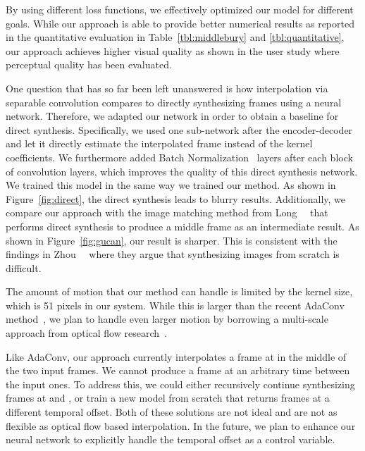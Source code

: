 \documentclass[10pt,twocolumn,letterpaper]{article}
\begin{document}
By using different loss functions, we effectively optimized our model for different goals. While our  approach is able to provide better numerical results as reported in the quantitative evaluation in Table~\ref{tbl:middlebury} and \ref{tbl:quantitative}, our  approach achieves higher visual quality as shown in the user study where perceptual quality has been evaluated. 

One question that has so far been left unanswered is how interpolation via separable convolution compares to directly synthesizing frames using a neural network. Therefore, we adapted our network in order to obtain a baseline for direct synthesis. Specifically, we used one sub-network after the encoder-decoder and let it directly estimate the interpolated frame instead of the kernel coefficients. We furthermore added Batch Normalization~\cite{Sergey_ICML_2015} layers after each block of convolution layers, which improves the quality of this direct synthesis network. We trained this model in the same way we trained our  method. As shown in Figure~\ref{fig:direct}, the direct synthesis leads to blurry results. Additionally, we compare our approach with the image matching method from Long~\etal~\cite{Long_ECCV_2016} that performs direct synthesis to produce a middle frame as an intermediate result. As shown in Figure~\ref{fig:gucan}, our result is sharper. This is consistent with the findings in Zhou~\etal~\cite{Zhou_ECCV_2016} where they argue that synthesizing images from scratch is difficult.

The amount of motion that our method can handle is limited by the kernel size, which is 51 pixels in our system. While this is larger than the recent AdaConv method~\cite{Niklaus_CVPR_2017}, we plan to handle even larger motion by borrowing a multi-scale approach from optical flow research~\cite{Ranjan_CORR_2016}.

Like AdaConv, our approach currently interpolates a frame at  in the middle of the two input frames. We cannot produce a frame at an arbitrary time between the input ones. To address this, we could either recursively continue synthesizing frames at  and , or train a new model from scratch that returns frames at a different temporal offset. Both of these solutions are not ideal and are not as flexible as optical flow based interpolation. In the future, we plan to enhance our neural network to explicitly handle the temporal offset as a control variable.
\end{document}
